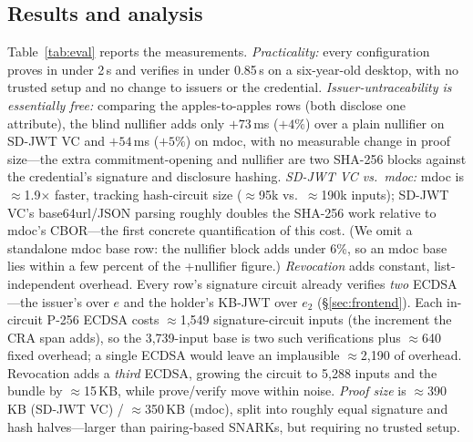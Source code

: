\documentclass[11pt]{article}
\theoremstyle{plain}
\theoremstyle{definition}
\begin{document}
\subsection{Results and analysis}
Table~\ref{tab:eval} reports the measurements. \emph{Practicality:} every
configuration proves in under 2\,s and verifies in under 0.85\,s on a six-year-old
desktop, with no trusted setup and no change to issuers or the credential.
\emph{Issuer-untraceability is essentially free:} comparing the apples-to-apples rows
(both disclose one attribute), the blind nullifier adds only $+73$\,ms ($+4\%$) over a
plain nullifier on SD-JWT VC and $+54$\,ms ($+5\%$) on mdoc, with no measurable change
in proof size---the extra commitment-opening and nullifier are two SHA-256 blocks
against the credential's signature and disclosure hashing. \emph{SD-JWT VC vs.\ mdoc:}
mdoc is $\approx$1.9$\times$ faster, tracking hash-circuit size ($\approx$95k vs.\
$\approx$190k inputs); SD-JWT VC's base64url/JSON parsing roughly doubles the SHA-256
work relative to mdoc's CBOR---the first concrete quantification of this cost. (We omit
a standalone mdoc base row: the nullifier block adds under 6\%, so an mdoc base lies
within a few percent of the +nullifier figure.)
\emph{Revocation} adds constant, list-independent overhead. Every row's signature
circuit already verifies \emph{two} ECDSA---the issuer's over $e$ and the holder's
KB-JWT over $e_2$ (\S\ref{sec:frontend}). Each in-circuit P-256 ECDSA costs
$\approx$1{,}549 signature-circuit inputs (the increment the CRA span adds), so the
3{,}739-input base is two such verifications plus $\approx$640 fixed overhead; a single
ECDSA would leave an implausible $\approx$2{,}190 of overhead. Revocation adds a
\emph{third} ECDSA, growing the circuit to 5{,}288 inputs and the bundle by
$\approx$15\,KB, while prove/verify move within noise. \emph{Proof size} is
$\approx$390\,KB (SD-JWT VC) / $\approx$350\,KB (mdoc), split into roughly equal
signature and hash halves---larger than pairing-based SNARKs, but requiring no trusted
setup.
\end{document}
